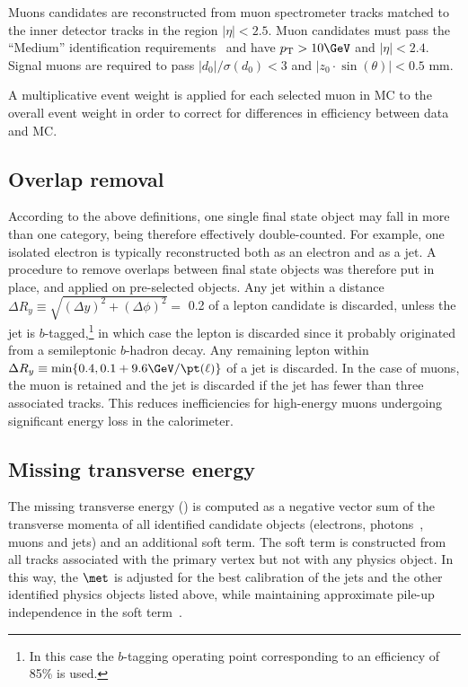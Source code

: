 Muons candidates are reconstructed from muon spectrometer tracks matched to 
the inner detector tracks in the region $|\eta|<2.5$.
Muon candidates must pass the ``Medium'' identification 
requirements~\cite{Aad:2016jkr} and have  $p_\mathrm{T} > 10\GeV$ and 
$|\eta| < 2.4$. 
Signal muons are required to pass $\vert d_0\vert/\sigma(d_0) < 3$
and $|z_0 \cdot\sin(\theta)|<0.5$ mm.
 
A multiplicative event weight is applied for each selected muon in MC to the overall event weight 
in order to correct for differences in efficiency between data and MC.

\subsection*{Overlap removal}
\label{subsec:sec.strategy.sel.objects_overlap_removal}

According to the above definitions, one single final state object may fall in more than one category, being therefore effectively double-counted. 
For example, one isolated electron is typically reconstructed both as an electron and as a jet. 
A procedure to remove overlaps between final state objects was therefore put in place, and applied on pre-selected objects. 
Any jet within a distance $\Delta R_y \equiv \sqrt{(\Delta y)^2+(\Delta\phi)^2} =$ 0.2 of a lepton candidate is discarded, 
unless the jet is $b$-tagged,\footnote{In this case the $b$-tagging operating point corresponding to an efficiency of 85\% is used.} 
in which case the lepton is discarded since it probably originated from a semileptonic $b$-hadron decay. 
Any remaining lepton within $\Delta R_y \equiv \operatorname{min}\{0.4, 0.1 + 9.6 \GeV/\pt(\ell)\}$ of a jet is discarded. 
In the case of muons, the muon is retained and the jet is discarded if the jet has fewer than three associated tracks. This reduces 
inefficiencies for high-energy muons undergoing significant energy loss in the calorimeter. 

\subsection*{Missing transverse energy}
\label{subsec:sec.strategy.sel.objects_met}

The missing transverse energy (\met) is computed as a negative vector sum of 
the transverse momenta 
of all identified candidate objects (electrons, photons~\cite{Aaboud:2016yuq}, muons and jets) and an additional soft term. 
The soft term is constructed from all tracks associated with the primary vertex but not with any physics object. 
In this way, the $\met$ is adjusted for the best calibration of the jets and the other identified physics objects listed above, 
while maintaining approximate pile-up independence in the soft term~\cite{ATL-PHYS-PUB-2015-027, ATL-PHYS-PUB-2015-023}.

